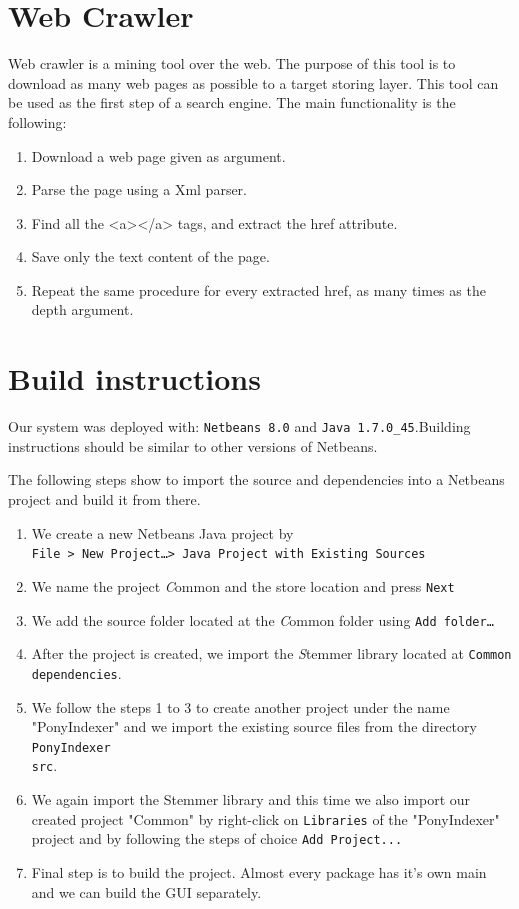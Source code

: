 \documentclass[letterpaper,twocolumn,10pt]{article}
\begin{document}
\section{Web Crawler}
Web crawler is a mining tool over the web. The purpose of this tool is to download as many web pages as possible to a target storing layer. This tool can be used as the first step of a search engine. The main functionality is the following:
\begin{enumerate}
  \item Download a web page given as argument.
  \item Parse the page using a Xml parser.
  \item Find all the <a></a> tags, and extract the href attribute.
  \item Save only the text content of the page.
  \item Repeat the same procedure for every extracted href, as many times as the depth argument.
\end{enumerate}

\section{Build instructions}
Our system was deployed with: {\tt Netbeans 8.0} and {\tt Java 1.7.0\_45}.Building instructions should be similar to other versions of Netbeans.

The following steps show to import the source and dependencies into a Netbeans project and build it from there.

\begin{enumerate}
	\item We create a new Netbeans Java project by \\
				{\tt File > New Project\ldots  > Java Project with Existing Sources }
	\item We name the project {\emph Common} and the store location and press
				{\tt Next}
	\item We add the source folder located at the {\emph Common} folder
				using {\tt Add folder\ldots}
	\item After the project is created, we import the {\emph Stemmer} library
				located at {\tt Common\\dependencies}.
	\item We follow the steps 1 to 3 to create another project under the name "PonyIndexer" and we import the existing source files from the directory {\tt PonyIndexer\\src}.
	\item We again import the Stemmer library and this time we also import our created project "Common" by right-click on {\tt Libraries} of the "PonyIndexer" project and by following the steps of choice {\tt Add Project...}
	\item Final step is to build the project. Almost every package has it's own main and we can build the GUI separately.
\end{enumerate}
\end{document}

